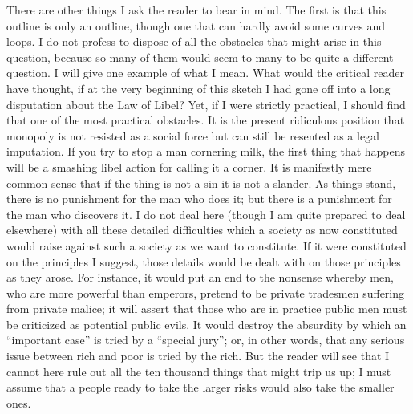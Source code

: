 \documentclass{book}
\begin{document}
There are other things I ask the reader to bear in mind. The first is that this outline is only an outline, though one that can hardly avoid some curves and loops. I do not profess to dispose of all the obstacles that might arise in this question, because so many of them would seem to many to be quite a different question. I will give one example of what I mean. What would the critical reader have thought, if at the very beginning of this sketch I had gone off into a long disputation about the Law of Libel? Yet, if I were strictly practical, I should find that one of the most practical obstacles. It is the present ridiculous position that monopoly is not resisted as a social force but can still be resented as a legal imputation. If you try to stop a man cornering milk, the first thing that happens will be a smashing libel action for calling it a corner. It is manifestly mere common sense that if the thing is not a sin it is not a slander. As things stand, there is no punishment for the man who does it; but there is a punishment for the man who discovers it. I do not deal here (though I am quite prepared to deal elsewhere) with all these detailed difficulties which a society as now constituted would raise against such a society as we want to constitute. If it were constituted on the principles I suggest, those details would be dealt with on those principles as they arose. For instance, it would put an end to the nonsense whereby men, who are more powerful than emperors, pretend to be private tradesmen suffering from private malice; it will assert that those who are in practice public men must be criticized as potential public evils. It would destroy the absurdity by which an “important case” is tried by a “special jury”; or, in other words, that any serious issue between rich and poor is tried by the rich. But the reader will see that I cannot here rule out all the ten thousand things that might trip us up; I must assume that a people ready to take the larger risks would also take the smaller ones.
\end{document}
